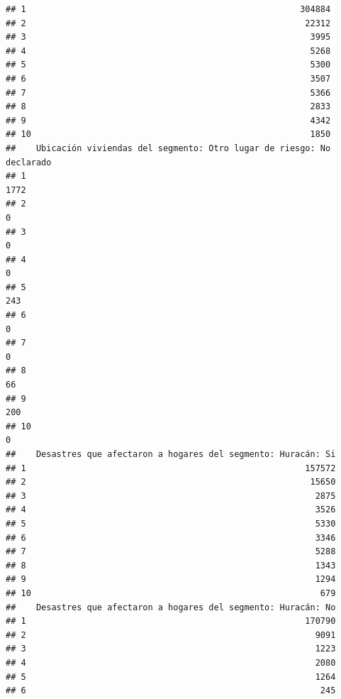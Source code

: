 \documentclass[11pt,]{article}
\begin{document}
\begin{verbatim}
## 1                                                      304884
## 2                                                       22312
## 3                                                        3995
## 4                                                        5268
## 5                                                        5300
## 6                                                        3507
## 7                                                        5366
## 8                                                        2833
## 9                                                        4342
## 10                                                       1850
##    Ubicación viviendas del segmento: Otro lugar de riesgo: No declarado
## 1                                                                  1772
## 2                                                                     0
## 3                                                                     0
## 4                                                                     0
## 5                                                                   243
## 6                                                                     0
## 7                                                                     0
## 8                                                                    66
## 9                                                                   200
## 10                                                                    0
##    Desastres que afectaron a hogares del segmento: Huracán: Si
## 1                                                       157572
## 2                                                        15650
## 3                                                         2875
## 4                                                         3526
## 5                                                         5330
## 6                                                         3346
## 7                                                         5288
## 8                                                         1343
## 9                                                         1294
## 10                                                         679
##    Desastres que afectaron a hogares del segmento: Huracán: No
## 1                                                       170790
## 2                                                         9091
## 3                                                         1223
## 4                                                         2080
## 5                                                         1264
## 6                                                          245

\end{verbatim}
\end{document}
